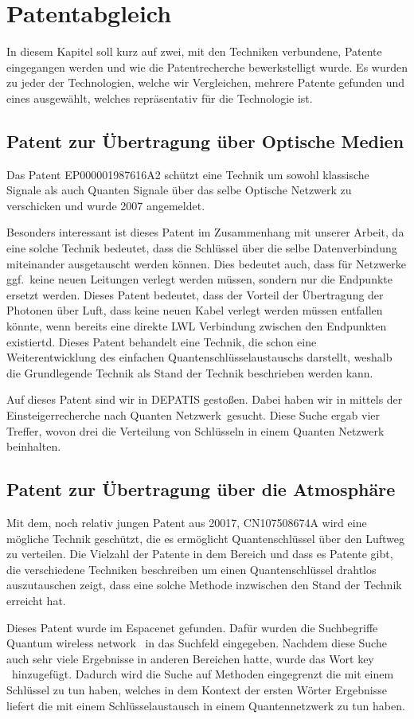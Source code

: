 \chapter{Patentabgleich}

In diesem Kapitel soll kurz auf zwei, mit den Techniken verbundene, Patente eingegangen werden und wie die Patentrecherche bewerkstelligt wurde.
Es wurden zu jeder der Technologien, welche wir Vergleichen, mehrere Patente gefunden und eines ausgewählt, welches repräsentativ für die Technologie ist.

\section{Patent zur Übertragung über Optische Medien}

Das Patent EP000001987616A2 schützt eine Technik um sowohl klassische Signale als auch Quanten Signale über das selbe Optische Netzwerk zu verschicken und wurde 2007 angemeldet.

Besonders interessant ist dieses Patent im Zusammenhang mit unserer Arbeit, da eine solche Technik bedeutet, dass die Schlüssel über die selbe Datenverbindung miteinander ausgetauscht werden können.
Dies bedeutet auch, dass für Netzwerke ggf.~keine neuen Leitungen verlegt werden müssen, sondern nur die Endpunkte ersetzt werden.
Dieses Patent bedeutet, dass der Vorteil der Übertragung der Photonen über Luft, dass keine neuen Kabel verlegt werden müssen entfallen könnte, wenn bereits eine direkte \ac{LWL} Verbindung zwischen den Endpunkten existiertd.
Dieses Patent behandelt eine Technik, die schon eine Weiterentwicklung des einfachen Quantenschlüsselaustauschs darstellt, weshalb die Grundlegende Technik als Stand der Technik beschrieben werden kann.

Auf dieses Patent sind wir in DEPATIS gestoßen.
Dabei haben wir in mittels der Einsteigerrecherche nach \glqq Quanten Netzwerk\grqq~gesucht.
Diese Suche ergab vier Treffer, wovon drei die Verteilung von Schlüsseln in einem Quanten Netzwerk beinhalten.

\section{Patent zur Übertragung über die Atmosphäre}

Mit dem, noch relativ jungen Patent aus 20017, CN107508674A wird eine mögliche Technik geschützt, die es ermöglicht Quantenschlüssel über den Luftweg zu verteilen.
Die Vielzahl der Patente in dem Bereich und dass es Patente gibt, die verschiedene Techniken beschreiben um einen Quantenschlüssel drahtlos auszutauschen zeigt, dass eine solche Methode inzwischen den Stand der Technik erreicht hat.

Dieses Patent wurde im Espacenet gefunden.
Dafür wurden die Suchbegriffe \glqq Quantum wireless network \grqq~in das Suchfeld eingegeben.
Nachdem diese Suche auch sehr viele Ergebnisse in anderen Bereichen hatte, wurde das Wort \glqq key \grqq~hinzugefügt.
Dadurch wird die Suche auf Methoden eingegrenzt die mit einem Schlüssel zu tun haben, welches in dem Kontext der ersten Wörter Ergebnisse liefert die mit einem Schlüsselaustausch in einem Quantennetzwerk zu tun haben.
